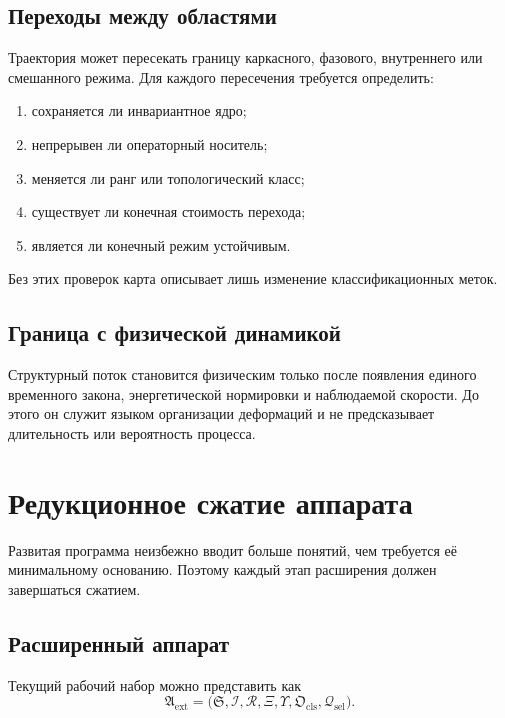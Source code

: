 \section{Переходы между областями}

Траектория может пересекать границу каркасного, фазового, внутреннего или
смешанного режима. Для каждого пересечения требуется определить:
\begin{enumerate}
 \item сохраняется ли инвариантное ядро;
 \item непрерывен ли операторный носитель;
 \item меняется ли ранг или топологический класс;
 \item существует ли конечная стоимость перехода;
 \item является ли конечный режим устойчивым.
\end{enumerate}

Без этих проверок карта описывает лишь изменение классификационных меток.

\section{Граница с физической динамикой}

Структурный поток становится физическим только после появления единого
временного закона, энергетической нормировки и наблюдаемой скорости. До этого
он служит языком организации деформаций и не предсказывает длительность или
вероятность процесса.

\chapter{Редукционное сжатие аппарата}

Развитая программа неизбежно вводит больше понятий, чем требуется её
минимальному основанию. Поэтому каждый этап расширения должен завершаться
сжатием.

\section{Расширенный аппарат}

Текущий рабочий набор можно представить как
\begin{equation}
 \mathfrak A_{\mathrm{ext}}=
 \bigl(\mathfrak S,\mathcal I,\mathcal R,
 \Xi,\Upsilon,\mathfrak O_{\mathrm{cls}},
 \mathcal Q_{\mathrm{sel}}\bigr).
\end{equation}

